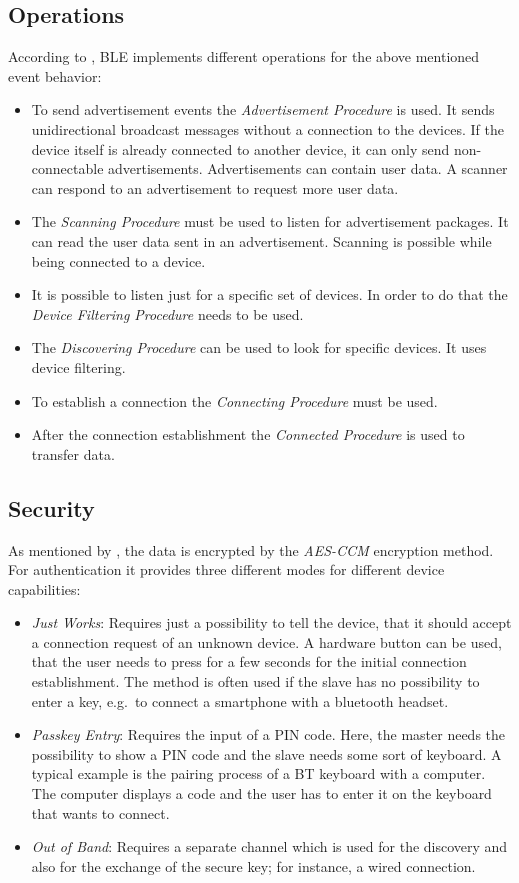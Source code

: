 \subsection*{Operations}
According to \citet{bluetooth:spec}, \ac{BLE} implements different operations for the above mentioned event behavior:
\begin{itemize}
  \item To send advertisement events the \emph{Advertisement Procedure} is used. It sends unidirectional broadcast messages without a connection to the devices. If the device itself is already connected to another device, it can only send non-connectable advertisements. Advertisements can contain user data. A scanner can respond to an advertisement to request more user data.
  \item The \emph{Scanning Procedure} must be used to listen for advertisement packages. It can read the user data sent in an advertisement. Scanning is possible while being connected to a device.
  \item It is possible to listen just for a specific set of devices. In order to do that the \emph{Device Filtering Procedure} needs to be used.
  \item The \emph{Discovering Procedure} can be used to look for specific devices. It  uses device filtering.
  \item To establish a connection the \emph{Connecting Procedure} must be used.
  \item After the connection establishment the \emph{Connected Procedure} is used to transfer data.
\end{itemize}

\subsection*{Security}
As mentioned by \citet{bluetooth:spec}, the data is encrypted by the \emph{AES-CCM} encryption method. For authentication it provides three different modes for different device capabilities:
\begin{itemize}
  \item \emph{Just Works}: Requires just a possibility to tell the device, that it should accept a connection request of an unknown device. A hardware button can be used, that the user needs to press for a few seconds for the initial connection establishment. The method is often used if the slave has no possibility to enter a key, e.g.\ to connect a smartphone with a bluetooth headset.
  \item \emph{Passkey Entry}: Requires the input of a PIN code. Here, the master needs the possibility to show a PIN code and the slave needs some sort of keyboard. A typical example is the pairing process of a \ac{BT} keyboard with a computer. The computer displays a code and the user has to enter it on the keyboard that wants to connect.
  \item \emph{Out of Band}: Requires a separate channel which is used for the discovery and also for the exchange of the secure key; for instance, a wired connection.
\end{itemize}


